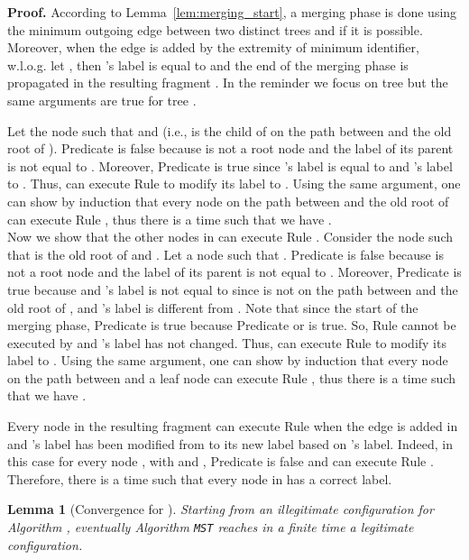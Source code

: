 \documentclass[11pt,a4paper]{article}
\newtheorem{lemma}{Lemma}
\newenvironment{proof}{\noindent \begin{rm}{\textbf{Proof.} }}{\hspace*{\fill}\par\end{rm}}
\newcommand{\MST}{\mbox{\tt MST}}
\begin{document}
\begin{proof}
According to Lemma~\ref{lem:merging_start}, a merging phase is done using the minimum outgoing edge  between two distinct trees  and  if it is possible. Moreover, when the edge  is added by the extremity of minimum identifier, w.l.o.g. let , then 's label is equal to  and the end of the merging phase is propagated in the resulting fragment . In the reminder we focus on tree  but the same arguments are true for tree .

Let the node  such that  and  (i.e.,  is the child of  on the path between  and the old root of ). Predicate  is false because  is not a root node and the label of its parent  is not equal to . Moreover, Predicate  is true since 's label is equal to  and 's label to . Thus,  can execute Rule  to modify its label to . Using the same argument, one can show by induction that every node  on the path between  and the old root of  can execute Rule , thus there is a time such that we have .\\
Now we show that the other nodes in  can execute Rule . Consider the node  such that  is the old root of  and . Let a node  such that . Predicate  is false because  is not a root node and the label of its parent is not equal to . Moreover, Predicate  is true because  and 's label is not equal to  since  is not on the path between  and the old root of , and 's label is different from . Note that since the start of the merging phase, Predicate  is true because Predicate  or  is true. So, Rule  cannot be executed by  and 's label has not changed. Thus,  can execute Rule  to modify its label to . Using the same argument, one can show by induction that every node  on the path between  and a leaf node can execute Rule , thus there is a time such that we have .

Every node  in the resulting fragment  can execute Rule  when the edge  is added in  and 's label has been modified from  to its new label based on 's label. Indeed, in this case for every node , with  and , Predicate  is false and  can execute Rule . Therefore, there is a time such that every node  in  has a correct label.
\end{proof}

\begin{lemma}[Convergence for ]
\label{lem:mst_convergence}
Starting from an illegitimate configuration for Algorithm , eventually Algorithm \MST\/ reaches in a finite time a legitimate configuration.
\end{lemma}
\end{document}

